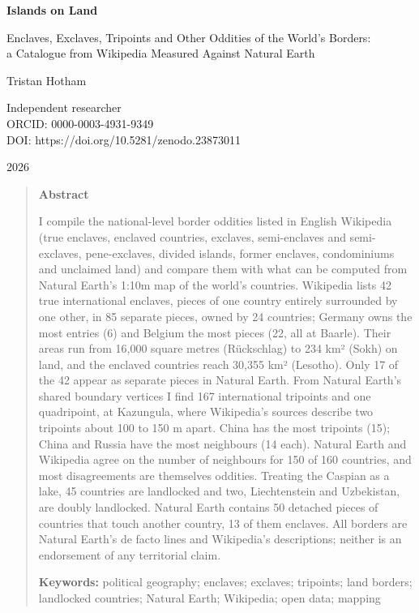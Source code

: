 \documentclass[11pt,a4paper]{article}
\begin{document}
\begin{center}
{\Large\bfseries Islands on Land\par}
\vspace{0.4em}
{\large Enclaves, Exclaves, Tripoints and Other Oddities of the World's Borders:\\a Catalogue from Wikipedia Measured Against Natural Earth\par}
\vspace{1.2em}
{\large Tristan Hotham\par}
\vspace{0.3em}
{\small Independent researcher\\
ORCID: 0000-0003-4931-9349\\
DOI: https://doi.org/10.5281/zenodo.23873011\par}
\vspace{0.8em}
2026
\end{center}

\begin{quote}
\small
\begin{center}\textbf{Abstract}\end{center}
I compile the national-level border oddities listed in English Wikipedia (true enclaves, enclaved countries, exclaves, semi-enclaves and semi-exclaves, pene-exclaves, divided islands, former enclaves, condominiums and unclaimed land) and compare them with what can be computed from Natural Earth's 1:10m map of the world's countries. Wikipedia lists 42 true international enclaves, pieces of one country entirely surrounded by one other, in 85 separate pieces, owned by 24 countries; Germany owns the most entries (6) and Belgium the most pieces (22, all at Baarle). Their areas run from 16,000 square metres (Rückschlag) to 234 km² (Sokh) on land, and the enclaved countries reach 30,355 km² (Lesotho). Only 17 of the 42 appear as separate pieces in Natural Earth. From Natural Earth's shared boundary vertices I find 167 international tripoints and one quadripoint, at Kazungula, where Wikipedia's sources describe two tripoints about 100 to 150 m apart. China has the most tripoints (15); China and Russia have the most neighbours (14 each). Natural Earth and Wikipedia agree on the number of neighbours for 150 of 160 countries, and most disagreements are themselves oddities. Treating the Caspian as a lake, 45 countries are landlocked and two, Liechtenstein and Uzbekistan, are doubly landlocked. Natural Earth contains 50 detached pieces of countries that touch another country, 13 of them enclaves. All borders are Natural Earth's de facto lines and Wikipedia's descriptions; neither is an endorsement of any territorial claim.

\textbf{Keywords:} political geography; enclaves; exclaves; tripoints; land borders; landlocked countries; Natural Earth; Wikipedia; open data; mapping
\end{quote}
\end{document}
